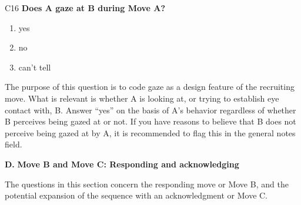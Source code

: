 \documentclass[output=paper]{langsci/langscibook}
\begin{document}
\begin{description}
\item
C16  \textbf{Does A gaze at B during Move A?}

\begin{enumerate}
\item {yes}
\item {no}
\item {can't tell}
\end{enumerate}

The purpose of this question is to code gaze as a design feature of the recruiting move. What is relevant is whether A is looking at, or trying to establish eye contact with, B. Answer “yes” on the basis of A’s behavior regardless of whether B perceives being gazed at or not. If you have reasons to believe that B does not perceive being gazed at by A, it is recommended to flag this in the general notes field.

\end{description}

\noindent \textbf{D.} \textbf{Move B and Move C: Responding and acknowledging} 

\medskip

\noindent The questions in this section concern the responding move or Move B, and the potential expansion of the sequence with an acknowledgment or Move C.
\end{document}
